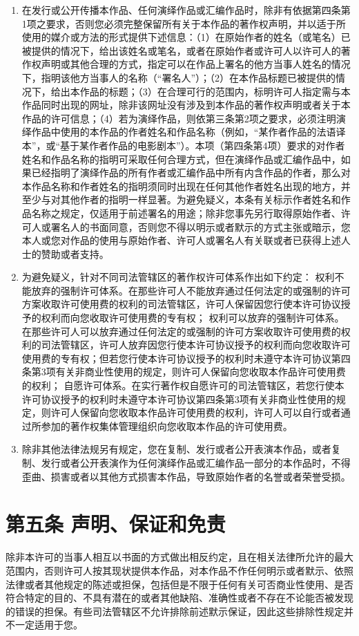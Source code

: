 \documentclass{book}
\begin{document}
\begin{enumerate}
	\item 在发行或公开传播本作品、任何演绎作品或汇编作品时，除非有依据第四条第1项之要求，否则您必须完整保留所有关于本作品的著作权声明，并以适于所使用的媒介或方法的形式提供下述信息：（1）在原始作者的姓名（或笔名）已被提供的情况下，给出该姓名或笔名，或者在原始作者或许可人以许可人的著作权声明或其他合理的方式，指定可以在作品上署名的他方当事人姓名的情况下，指明该他方当事人的名称（“署名人”）；（2）在本作品标题已被提供的情况下，给出本作品的标题；（3）在合理可行的范围内，标明许可人指定需与本作品同时出现的网址，除非该网址没有涉及到本作品的著作权声明或者关于本作品的许可信息；（4）若为演绎作品，则依第三条第2项之要求，必须注明演绎作品中使用的本作品的作者姓名和作品名称（例如，“某作者作品的法语译本”，或“基于某作者作品的电影剧本”）。本项（第四条第4项）要求的对作者姓名和作品名称的指明可采取任何合理方式，但在演绎作品或汇编作品中，如果已经指明了演绎作品的所有作者或汇编作品中所有内含作品的作者，那么对本作品名称和作者姓名的指明须同时出现在任何其他作者姓名出现的地方，并至少与对其他作者的指明一样显著。为避免疑义，本条有关标示作者姓名和作品名称之规定，仅适用于前述署名的用途；除非您事先另行取得原始作者、许可人或署名人的书面同意，否则您不得以明示或者默示的方式主张或暗示，您本人或您对作品的使用与原始作者、许可人或署名人有关联或者已获得上述人士的赞助或者支持。
	\item 为避免疑义，针对不同司法管辖区的著作权许可体系作出如下约定：
	\subitem 权利不能放弃的强制许可体系。在那些许可人不能放弃通过任何法定的或强制的许可方案收取许可使用费的权利的司法管辖区，许可人保留因您行使本许可协议授予的权利而向您收取许可使用费的专有权；
	\subitem 权利可以放弃的强制许可体系。在那些许可人可以放弃通过任何法定的或强制的许可方案收取许可使用费的权利的司法管辖区，许可人放弃因您行使本许可协议授予的权利而向您收取许可使用费的专有权；但若您行使本许可协议授予的权利时未遵守本许可协议第四条第3项有关非商业性使用的规定，则许可人保留向您收取本作品许可使用费的权利；
	\subitem 自愿许可体系。在实行著作权自愿许可的司法管辖区，若您行使本许可协议授予的权利时未遵守本许可协议第四条第3项有关非商业性使用的规定，则许可人保留向您收取本作品许可使用费的权利，许可人可以自行或者通过所参加的著作权集体管理组织向您收取本作品的许可使用费。
	\item 除非其他法律法规另有规定，您在复制、发行或者公开表演本作品，或者复制、发行或者公开表演作为任何演绎作品或汇编作品一部分的本作品时，不得歪曲、损害或者以其他方式损害本作品，导致原始作者的名誉或者荣誉受损。
\end{enumerate}
\section{第五条 声明、保证和免责}
除非本许可的当事人相互以书面的方式做出相反约定，且在相关法律所允许的最大范围内，否则许可人按其现状提供本作品，对本作品不作任何明示或者默示、依照法律或者其他规定的陈述或担保，包括但是不限于任何有关可否商业性使用、是否符合特定的目的、不具有潜在的或者其他缺陷、准确性或者不存在不论能否被发现的错误的担保。有些司法管辖区不允许排除前述默示保证，因此这些排除性规定并不一定适用于您。
\end{document}
